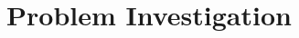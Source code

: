 \documentclass[../main.tex]{subfiles}
\begin{document}
\section{Problem Investigation}






\end{document}
